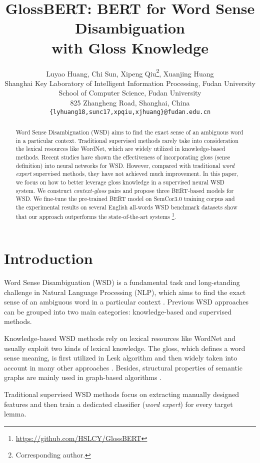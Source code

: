 \documentclass[11pt,a4paper]{article}
\title{GlossBERT: BERT for Word Sense Disambiguation \\
with Gloss Knowledge}
\author{Luyao Huang, Chi Sun, Xipeng Qiu\thanks{{ }{ }Corresponding author.}, Xuanjing Huang\\
    Shanghai Key Laboratory of Intelligent Information Processing, Fudan University\\
    School of Computer Science, Fudan University\\
    825 Zhangheng Road, Shanghai, China\\
    {\tt \{lyhuang18,sunc17,xpqiu,xjhuang\}@fudan.edu.cn} \\}
\date{}
\begin{document}
\maketitle



\begin{abstract}
Word Sense Disambiguation (WSD) aims to find the exact sense of an ambiguous word in a particular context. Traditional supervised methods rarely take into consideration the lexical resources like WordNet, which are widely utilized in knowledge-based methods. Recent studies have shown the effectiveness of incorporating gloss (sense definition) into neural networks for WSD. However, compared with traditional \textit{word expert} supervised methods, they have not achieved much improvement.
In this paper, we focus on how to better leverage gloss knowledge in a supervised neural WSD system. We construct \textit{context-gloss} pairs and propose three BERT-based models for WSD. We fine-tune the pre-trained BERT model on SemCor3.0 training corpus and the experimental results on several English all-words WSD benchmark datasets show that our approach outperforms the state-of-the-art systems \footnote{\url{https://github.com/HSLCY/GlossBERT}}.


\end{abstract}



\section{Introduction}
Word Sense Disambiguation (WSD) is a fundamental task and long-standing challenge in Natural Language Processing (NLP), which aims to find the exact sense of an ambiguous word in a particular context \citep{navigli2009word}. Previous WSD approaches can be grouped into two main categories: knowledge-based and supervised methods.

Knowledge-based WSD methods rely on lexical resources like WordNet \citep{miller1995wordnet} and usually exploit two kinds of lexical knowledge. The gloss, which defines a word sense meaning, is first utilized in Lesk algorithm \citep{lesk1986automatic} and then widely taken into account in many other approaches \citep{banerjee2002adapted, basile2014enhanced}. Besides, structural properties of semantic graphs are mainly used in graph-based algorithms \citep{agirre2014random, moro2014entity}.


Traditional supervised WSD methods \citep{zhong2010makes, shen2013coarse, iacobacci2016embeddings} focus on extracting manually designed features
and then train a dedicated classifier (\textit{word expert}) for every target lemma.
\end{document}

